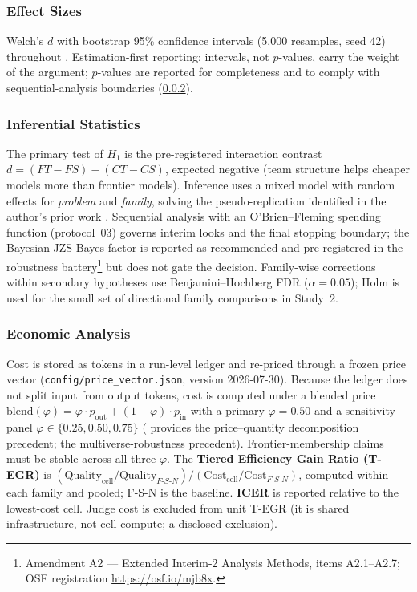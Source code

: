 \documentclass[12pt,a4paper]{article}
\newcommand{\phiBlend}{\varphi}
\begin{document}
\subsubsection{Effect Sizes}

Welch's $d$ with bootstrap 95\% confidence intervals (5{,}000 resamples, seed
42) throughout \citep{Lakens2013}. Estimation-first reporting: intervals, not
$p$-values, carry the weight of the argument; $p$-values are reported for
completeness and to comply with sequential-analysis boundaries
(\cref{sec:inferential}).

\subsubsection{Inferential Statistics}\label{sec:inferential}

The primary test of $H_1$ is the pre-registered interaction contrast
$d = (FT - FS) - (CT - CS)$, expected negative (team structure helps cheaper
models more than frontier models). Inference uses a mixed model with random
effects for \emph{problem} and \emph{family}, solving the pseudo-replication
identified in the author's
prior work \citep{Hariri2026b}. Sequential analysis with an O'Brien--Fleming
spending function (protocol~03) governs interim looks and the final stopping
boundary; the Bayesian JZS Bayes factor is reported as recommended and
pre-registered in the robustness battery\footnote{Amendment A2 --- Extended
Interim-2 Analysis Methods, items A2.1--A2.7; OSF registration
\url{https://osf.io/mjb8x}.} but
does not gate the decision. Family-wise corrections within secondary hypotheses
use Benjamini--Hochberg FDR ($\alpha = 0.05$); Holm is used for the small set of
directional family comparisons in Study~2.

\subsubsection{Economic Analysis}

Cost is stored as tokens in a run-level ledger and re-priced through a frozen
price vector (\texttt{config/price\_vector.json}, version 2026-07-30). Because
the ledger does not split input from output tokens, cost is computed under a
blended price $\mathrm{blend}(\phiBlend) = \phiBlend \cdot p_{\mathrm{out}} +
(1 - \phiBlend) \cdot p_{\mathrm{in}}$ with a primary $\phiBlend = 0.50$ and a
sensitivity panel $\phiBlend \in \{0.25, 0.50, 0.75\}$ (\citealt{Diewert1976}
provides the price--quantity decomposition precedent; \citealt{SteegenEtAl2016}
the multiverse-robustness precedent). Frontier-membership claims must be stable
across all three $\phiBlend$. The \textbf{Tiered Efficiency Gain Ratio (T-EGR)}
is $(\mathrm{Quality}_{\mathrm{cell}} / \mathrm{Quality}_{F\text{-}S\text{-}N})
/ (\mathrm{Cost}_{\mathrm{cell}} / \mathrm{Cost}_{F\text{-}S\text{-}N})$,
computed within each family and pooled; F-S-N is the baseline. \textbf{ICER} is
reported relative to the lowest-cost cell. Judge cost is excluded from unit T-EGR
(it is shared infrastructure, not cell compute; a disclosed exclusion).
\end{document}
